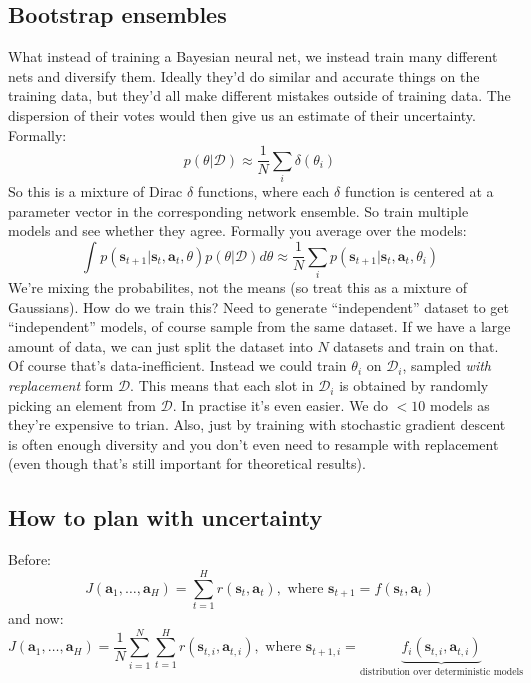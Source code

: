\documentclass{report}
\begin{document}
\subsection{Bootstrap ensembles}
What instead of training a Bayesian neural net, we instead train many different nets and diversify them.
Ideally they'd do similar and accurate things on the training data, but they'd all make different mistakes outside of training data.
The dispersion of their votes would then give us an estimate of their uncertainty.
Formally:
\begin{equation}
		p(\theta|\mathcal{D}) \approx \frac{1}{N} \sum_{i}^{} \delta(\theta_i)
\end{equation}
So this is a mixture of Dirac $\delta$ functions, where each $\delta$ function is centered at a parameter vector
in the corresponding network ensemble.
So train multiple models and see whether they agree. Formally you average over the models:
\begin{equation}
\int_{}^{} p(\bm{s}_{t+1}| \bm{s}_{t}, \bm{a}_{t}, \theta) p(\theta | \mathcal{D})d\theta	
\approx \frac{1}{N} \sum_{i}^{} p(\bm{s}_{t+1}| \bm{s}_{t}, \bm{a}_{t}, \theta_i)
\end{equation}
We're mixing the probabilites, not the means (so treat this as a mixture of Gaussians).
How do we train this?
Need to generate ``independent'' dataset to get ``independent'' models, of course sample from the same dataset.
If we have a large amount of data, we can just split the dataset into $N$ datasets and train on that.
Of course that's data-inefficient.
Instead we could train $\theta_i$ on $\mathcal{D}_i$, sampled \textit{with replacement} form $\mathcal{D}$.
This means that each slot in $\mathcal{D}_i$ is obtained by randomly picking an element from $\mathcal{D}$.
In practise it's even easier. We do $<10$ models as they're expensive to trian.
Also, just by training with stochastic gradient descent is often enough diversity and you don't 
even need to resample with replacement (even though that's still important for theoretical results).

\subsection{How to plan with uncertainty}
Before:
\begin{equation}
		J(\bm{a}_{1}, \dots, \bm{a}_{H}) = \sum_{t=1}^{H} r (\bm{s}_{t}, \bm{a}_{t} ), \text{ where } \bm{s}_{t+1} = f (\bm{s}_{t}, \bm{a}_{t} )
\end{equation}
and now:
\begin{equation}
		J(\bm{a}_{1}, \dots, \bm{a}_{H}) = \frac{1}{N}  \sum_{i=1}^{N} \sum_{t=1}^{H} r (\bm{s}_{t,i}, \bm{a}_{t,i} ), \text{ where } \bm{s}_{t+1,i} = 
		\underbrace{f_i (\bm{s}_{t,i}, \bm{a}_{t,i} )}_{\text{distribution over deterministic models}}
\end{equation}
\end{document}

